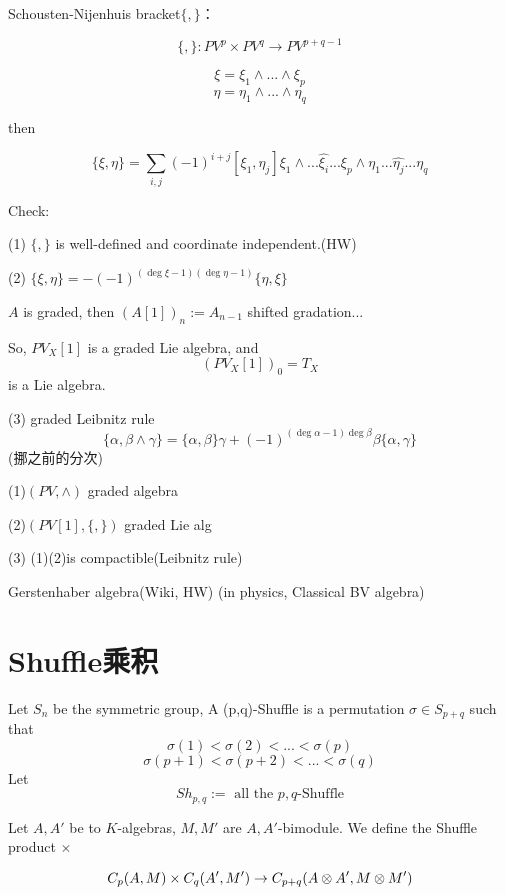 Schousten-Nijenhuis bracket$\{,\}$：

$$\{,\}:PV^p\times PV^q\to PV^{p+q-1}$$

$$\xi=\xi_1\wedge...\wedge\xi_p$$
$$\eta=\eta_1\wedge...\wedge\eta_q$$

then

$$\{\xi,\eta\}=\sum_{i,j}(-1)^{i+j}[\xi_1,\eta_j]
\xi_1\wedge...\widehat{\xi_i}...\xi_p\wedge\eta_1...\widehat{\eta_j}...\eta_q$$

Check:

(1) $\{,\}$ is well-defined and coordinate independent.(HW)

(2) $\{\xi,\eta\}=-(-1)^{(\deg\xi-1)(\deg\eta-1)}\{\eta,\xi\}$

\begin{notation}
$A$ is graded, then $(A[1])_n:=A_{n-1}$ shifted gradation...
\end{notation}

So, $PV_X[1]$ is a graded Lie algebra, and
$$(PV_X[1])_0=T_X$$
is a Lie algebra.

(3) graded  Leibnitz rule
$$\{\alpha,\beta\wedge\gamma\}
=\{\alpha,\beta\}\gamma+(-1)^{(\deg\alpha-1)\deg\beta}
\beta\{\alpha,\gamma\}$$
(挪之前的分次)

\begin{prop}

(1)$(PV,\wedge)$ graded algebra

(2)$(PV[1],\{,\})$ graded Lie alg

(3) (1)(2)is compactible(Leibnitz rule)

\end{prop}

Gerstenhaber algebra(Wiki, HW)
(in physics, Classical BV algebra)


\section{Shuffle乘积}

\begin{definition}
Let $S_n$ be the symmetric group, A (p,q)-Shuffle is
 a permutation $\sigma\in S_{p+q}$ such that
 $$\sigma(1)<\sigma(2)<...<\sigma(p)$$
  $$\sigma(p+1)<\sigma(p+2)<...<\sigma(q)$$
Let
$$Sh_{p,q}:=\text{ all the $p,q$-Shuffle}$$
\end{definition}

Let $A,A'$ be to $K$-algebras,
$M,M'$ are $A,A'$-bimodule. We define the Shuffle product $\times$

$$C_p(A,M)\times C_q(A',M')\to C_{p+q}(A\otimes A',M\otimes M')$$

